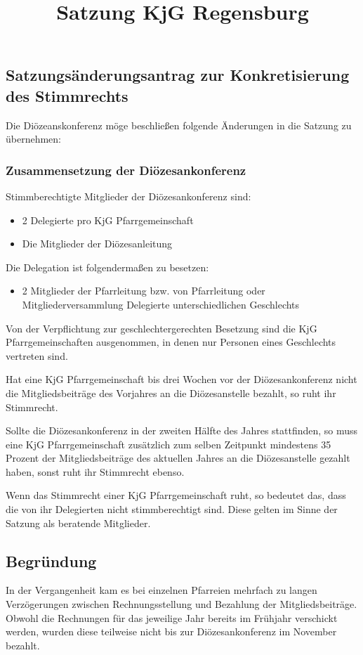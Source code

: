 \documentclass[12pt]{report}
\title{Satzung KjG Regensburg}
\author{}
\begin{document}
\subsection*{Satzungsänderungsantrag zur Konkretisierung des Stimmrechts}
\begin{flushleft}

Die Diözeanskonferenz möge beschließen folgende Änderungen in die Satzung zu übernehmen:

\subsubsection{Zusammensetzung der Diözesankonferenz}
Stimmberechtigte Mitglieder der Diözesankonferenz sind:
\begin{itemize}
  \item 2 Delegierte pro KjG Pfarrgemeinschaft
  \item Die Mitglieder der Diözesanleitung
\end{itemize}

Die Delegation ist folgendermaßen zu besetzen:
\begin{itemize}
  \item{ 2 Mitglieder der Pfarrleitung bzw. von Pfarrleitung oder Mitgliederversammlung
        Delegierte unterschiedlichen Geschlechts}
\end{itemize}

Von der Verpflichtung zur geschlechtergerechten Besetzung sind die KjG Pfarrgemeinschaften ausgenommen,
in denen nur Personen eines Geschlechts vertreten sind.

{\color{green}Hat eine KjG Pfarrgemeinschaft bis drei Wochen vor der Diözesankonferenz nicht die
Mitgliedsbeiträge des Vorjahres an die Diözesanstelle bezahlt, so ruht ihr Stimmrecht.

Sollte die Diözesankonferenz in der zweiten Hälfte des Jahres stattfinden, 
so muss eine KjG Pfarrgemeinschaft zusätzlich zum selben Zeitpunkt mindestens 35 Prozent der Mitgliedsbeiträge des aktuellen Jahres an die Diözesanstelle gezahlt haben,
sonst ruht ihr Stimmrecht ebenso.

Wenn das Stimmrecht einer KjG Pfarrgemeinschaft ruht, so bedeutet das, dass die von ihr Delegierten
nicht stimmberechtigt sind. Diese gelten im Sinne der Satzung als beratende Mitglieder.
\bigskip}

\subsection*{Begründung}
In der Vergangenheit kam es bei einzelnen Pfarreien mehrfach zu langen Verzögerungen zwischen Rechnungsstellung und Bezahlung der Mitgliedsbeiträge.
Obwohl die Rechnungen für das jeweilige Jahr bereits im Frühjahr verschickt werden, wurden diese teilweise nicht bis zur Diözesankonferenz im November bezahlt.


\end{flushleft}
\end{document}
